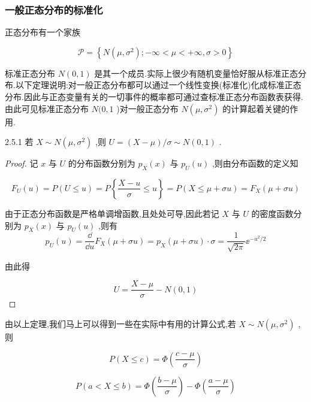 \subsubsection{一般正态分布的标准化}

正态分布有一个家族

\[
\mathscr{P}=\left\{N\left(\mu, \sigma^{2}\right) ;-\infty<\mu<+\infty, \sigma>0\right\}
\]

标准正态分布 $ N(0,1) $ 是其一个成员.实际上很少有随机变量恰好服从标准正态分布.以下定理说明:对一般正态分布都可以通过一个线性变换(标准化)化成标准正态分布.因此与正态变量有关的一切事件的概率都可通过查标准正态分布函数表获得.由此可见标准正态分布 $ N(0,1 $ )对一般正态分布 $ N\left(\mu, \sigma^{2}\right) $ 的计算起着关键的作用.

\begin{theorem}{}{2.5.1}
	若 $ X \sim N\left(\mu, \sigma^{2}\right) $ ,则 $ U=(X-\mu) / \sigma \sim N(0,1) $ .
\end{theorem}

\begin{proof}
	记 $ x $ 与 $ U $ 的分布函数分别为 $ p_{X}(x) $ 与 $ p_{U}(u) $ ,则由分布函数的定义知
	
	\[
	F_{U}(u)=P(U \leqslant u)=P\left\{\frac{X-u}{\sigma} \leqslant u\right\}=P(X \leqslant \mu+\sigma u)=F_{X}(\mu+\sigma u)
	\]
	
	由于正态分布函数是严格单调增函数,且处处可导,因此若记 $ X $ 与 $ U $ 的密度函数分别为 $ p_{X}(x) $ 与 $ p_{U}(u) $ ,则有
	\[
	p_{U}(u)=\frac{\dd}{\dd u} F_{X}(\mu+\sigma u)=p_{X}(\mu+\sigma u) \cdot \sigma=\frac{1}{\sqrt{2 \pi}} \ee ^{-u^{2} / 2}
	\]
	
	由此得
	
	\[
	U=\frac{X-\mu}{\sigma}-N(0,1)
	\]
\end{proof}


由以上定理,我们马上可以得到一些在实际中有用的计算公式,若 $ X \sim N\left(\mu, \sigma^{2}\right) $ ,则

\begin{equation}
P(X \leqslant c)=\Phi\left(\frac{c-\mu}{\sigma}\right) \label{eq:2.5.3}
\end{equation}

\begin{equation}
P(a<X \leqslant b)=\Phi\left(\frac{b-\mu}{\sigma}\right)-\Phi\left(\frac{a-\mu}{\sigma}\right) \label{eq:2.5.4}
\end{equation}

